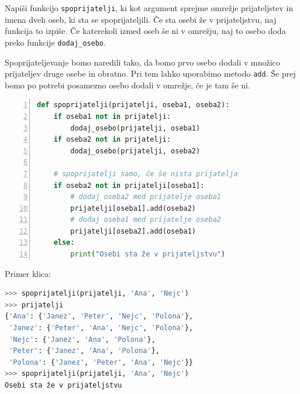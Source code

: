 \begin{zgled}
Napiši funkcijo \texttt{spoprijatelji}, ki kot argument sprejme omrežje prijateljstev in imena dveh oseb, ki sta se spoprijateljili. Če sta osebi že v prijateljstvu, naj funkcija to izpiše. Če katerekoli izmed oseb še ni v omrežju, naj to osebo doda preko funkcije \texttt{dodaj\_osebo}.
\end{zgled}
\begin{resitev}
Spoprijateljevanje bomo naredili tako, da bomo prvo osebo dodali v množico prijateljev druge osebe in obratno. Pri tem lahko uporabimo metodo \texttt{add}. Še prej bomo po potrebi posamezno osebo dodali v omrežje, če je tam še ni.
\begin{lstlisting}[language=Python,numbers=left]
def spoprijatelji(prijatelji, oseba1, oseba2):
    if oseba1 not in prijatelji:
        dodaj_osebo(prijatelji, oseba1) 
    if oseba2 not in prijatelji:
        dodaj_osebo(prijatelji, oseba2) 
    
    # spoprijatelji samo, če še nista prijatelja
    if oseba2 not in prijatelji[oseba1]:
        # dodaj oseba2 med prijatelje oseba1
        prijatelji[oseba1].add(oseba2)
        # dodaj oseba1 med prijatelje oseba2
        prijatelji[oseba2].add(oseba1)
    else:
        print("Osebi sta že v prijateljstvu")
\end{lstlisting}
Primer klica:
\begin{lstlisting}[language=Python]
>>> spoprijatelji(prijatelji, 'Ana', 'Nejc')
>>> prijatelji
{'Ana': {'Janez', 'Peter', 'Nejc', 'Polona'}, 
 'Janez': {'Peter', 'Ana', 'Nejc', 'Polona'}, 
 'Nejc': {'Janez', 'Ana', 'Polona'}, 
 'Peter': {'Janez', 'Ana', 'Polona'}, 
 'Polona': {'Janez', 'Peter', 'Ana', 'Nejc'}}
>>> spoprijatelji(prijatelji, 'Ana', 'Nejc')
Osebi sta že v prijateljstvu
\end{lstlisting}

\end{resitev}

